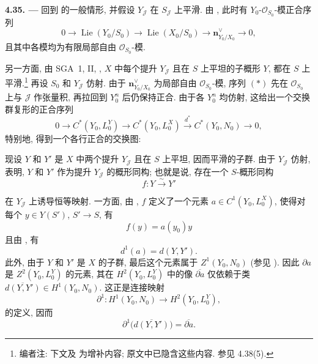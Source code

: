 \medskip
\noindent{}\textbf{4.35. ---}
回到  的一般情形,
并假设 \(Y_{\mathscr J}\) 在 \(S_{\mathscr J}\) 上平滑.
由 , 此时有
\(Y_0\)-\(\mathscr O_{S_0}\)-模正合序列
\[
 \tag{*}\label{sga3:iii:paragraph:4-35:equation:star}
 0\longrightarrow\operatorname{Lie}(Y_0/S_0)
 \longrightarrow\operatorname{Lie}(X_0/S_0)
 \longrightarrow\mathbf n_{Y_0/X_0}^{\vee}\longrightarrow0,
\]
且其中各模均为有限局部自由 \(\mathscr O_{S_0}\)-模.

另一方面, 由 SGA~1, II, ,
\(X\) 中每个提升 \(Y_{\mathscr J}\) 且在 \(S\) 上平坦的子概形 \(Y\),
都在 \(S\) 上平滑.\footnote{编者注: 下文及
 为增补内容;
原文中已隐含这些内容. 参见 4.38(5).}
再设 \(S_0\) 和 \(Y_{\mathscr J}\) 仿射.
由于 \(\mathbf n_{Y_0/X_0}^{\vee}\) 为局部自由 \(\mathscr O_{S_0}\)-模,
序列 \((*)\) 先在 \(\mathscr O_{S_0}\) 上与 \(\mathscr J\) 作张量积,
再拉回到 \(Y_0^n\) 后仍保持正合. 由于各 \(Y_0^n\) 均仿射,
这给出一个交换群复形的正合序列
\[
 0\longrightarrow C^*(Y_0,L_0^Y)
 \longrightarrow C^*(Y_0,L_0^X)
 \xrightarrow{d^*}C^*(Y_0,N_0)\longrightarrow0,
\]
特别地, 得到一个各行正合的交换图:

\begin{center}
\end{center}

现设 \(Y\) 和 \(Y'\) 是 \(X\) 中两个提升 \(Y_{\mathscr J}\) 且在 \(S\)
上平坦, 因而平滑的子群. 由于 \(Y_{\mathscr J}\) 仿射,
 表明,
\(Y\) 和 \(Y'\) 作为提升 \(Y_{\mathscr J}\) 的概形同构;
也就是说, 存在一个 \(S\)-概形同构
\[
 f:Y\xrightarrow{\sim}Y'
\]

在 \(Y_{\mathscr J}\) 上诱导恒等映射.
一方面, 由 ,
\(f\) 定义了一个元素 \(a\in C^1(Y_0,L_0^X)\), 使得对每个
\(y\in Y(S')\), \(S'\to S\), 有
\[
 f(y)=a(y_0)y
\]
且由 , 有
\[
 d^1(a)=d(Y,Y').
\]
此外, 由于 \(Y\) 和 \(Y'\) 是 \(X\) 的子群,
最后这个元素属于 \(Z^1(Y_0,N_0)\) (参见 ).
因此 \(\partial a\) 是 \(Z^2(Y_0,L_0^Y)\) 的元素,
其在 \(H^2(Y_0,L_0^Y)\) 中的像 \(\overline{\partial a}\)
仅依赖于类 \(\overline{d(Y,Y')}\in H^1(Y_0,N_0)\).
这正是连接映射
\[
 \partial^1:H^1(Y_0,N_0)\longrightarrow H^2(Y_0,L_0^Y),
\]
的定义, 因而
\[
 \partial^1\bigl(\overline{d(Y,Y')}\bigr)
 =\overline{\partial a}.
\]

